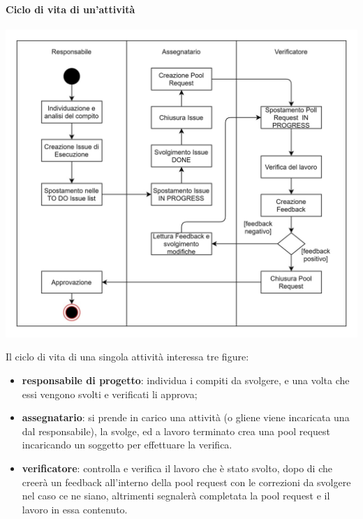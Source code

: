 \paragraph{Ciclo di vita di un'attività}
\begin{center}
    \includegraphics[scale=1.6]{res/images/ciclo_di_vita_ticket.jpg}
\end{center}
Il ciclo di vita di una singola attività interessa tre figure:
\begin{itemize}
    \item \textbf{responsabile di progetto}: individua i compiti da svolgere, e una volta che essi vengono svolti e verificati li approva;
    \item \textbf{assegnatario}: si prende in carico una attività (o gliene viene incaricata una dal responsabile), la svolge, ed a lavoro terminato crea una pool request incaricando un soggetto per effettuare la verifica.
    \item \textbf{verificatore}: controlla e verifica il lavoro che è stato svolto, dopo di che creerà un feedback all'interno della pool request con le correzioni da svolgere nel caso ce ne siano, altrimenti segnalerà completata la pool request e il lavoro in essa contenuto.
\end{itemize}

